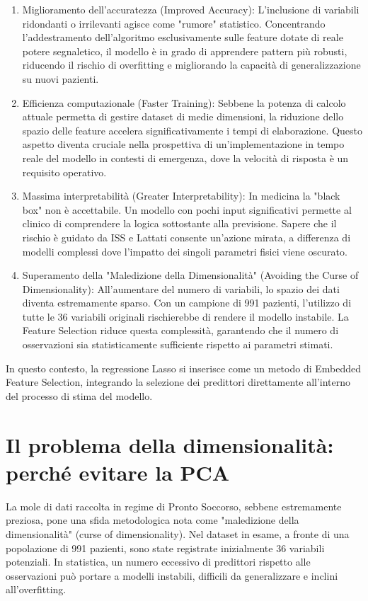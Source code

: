 \documentclass[11pt, oneside, noexaminfo]{sapthesis}   	%
\begin{document}
\begin{enumerate}
\item {Miglioramento dell'accuratezza (Improved Accuracy)}: L'inclusione di variabili ridondanti o irrilevanti agisce come "rumore" statistico. Concentrando l'addestramento dell'algoritmo esclusivamente sulle feature dotate di reale potere segnaletico, il modello è in grado di apprendere pattern più robusti, riducendo il rischio di {overfitting} e migliorando la capacità di generalizzazione su nuovi pazienti.
\item {Efficienza computazionale (Faster Training)}: Sebbene la potenza di calcolo attuale permetta di gestire dataset di medie dimensioni, la riduzione dello spazio delle feature accelera significativamente i tempi di elaborazione. Questo aspetto diventa cruciale nella prospettiva di un'implementazione in tempo reale del modello in contesti di emergenza, dove la velocità di risposta è un requisito operativo.

\item {Massima interpretabilità (Greater Interpretability)}: In medicina la "black box" non è accettabile. Un modello con pochi input significativi permette al clinico di comprendere la logica sottostante alla previsione. Sapere che il rischio è guidato da ISS e Lattati consente un'azione mirata, a differenza di modelli complessi dove l'impatto dei singoli parametri fisici viene oscurato.

\item {Superamento della "Maledizione della Dimensionalità" (Avoiding the Curse of Dimensionality)}: All'aumentare del numero di variabili, lo spazio dei dati diventa estremamente sparso. Con un campione di 991 pazienti, l'utilizzo di tutte le 36 variabili originali rischierebbe di rendere il modello instabile. La Feature Selection riduce questa complessità, garantendo che il numero di osservazioni sia statisticamente sufficiente rispetto ai parametri stimati.

\end{enumerate}
In questo contesto, la regressione Lasso si inserisce come un metodo di Embedded Feature Selection, integrando la selezione dei predittori direttamente all'interno del processo di stima del modello.

\section{Il problema della dimensionalità: perché evitare la PCA}
La mole di dati raccolta in regime di Pronto Soccorso, sebbene estremamente preziosa, pone una sfida metodologica nota come "maledizione della dimensionalità" (curse of dimensionality). Nel dataset in esame, a fronte di una popolazione di 991 pazienti, sono state registrate inizialmente 36 variabili potenziali. In statistica, un numero eccessivo di predittori rispetto alle osservazioni può portare a modelli instabili, difficili da generalizzare e inclini all'overfitting.
\end{document}
